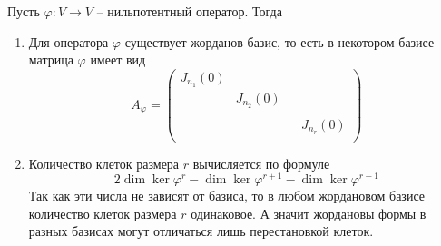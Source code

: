 \begin{claim}\label{claim::NilJNF}
Пусть $\varphi\colon V\to V$ -- нильпотентный оператор. Тогда
\begin{enumerate}
\item Для оператора $\varphi$ существует жорданов базис, то есть в некотором базисе матрица $\varphi$ имеет вид
\[
A_\varphi = 
\begin{pmatrix}
{J_{n_1}(0)}&{}&{}&{}\\
{}&{J_{n_2}(0)}&{}&{}\\
{}&{}&{}&{}\\
{}&{}&{}&{J_{n_r}(0)}\\
\end{pmatrix}
\]
\item Количество клеток размера $r$ вычисляется по формуле
\[
2\dim \ker \varphi^r - \dim \ker \varphi^{r+1} - \dim \ker \varphi^{r-1}
\]
Так как эти числа не зависят от базиса, то в любом жордановом базисе количество клеток размера $r$ одинаковое. А значит жордановы формы в разных базисах могут отличаться лишь перестановкой клеток.
\end{enumerate}
\end{claim}
